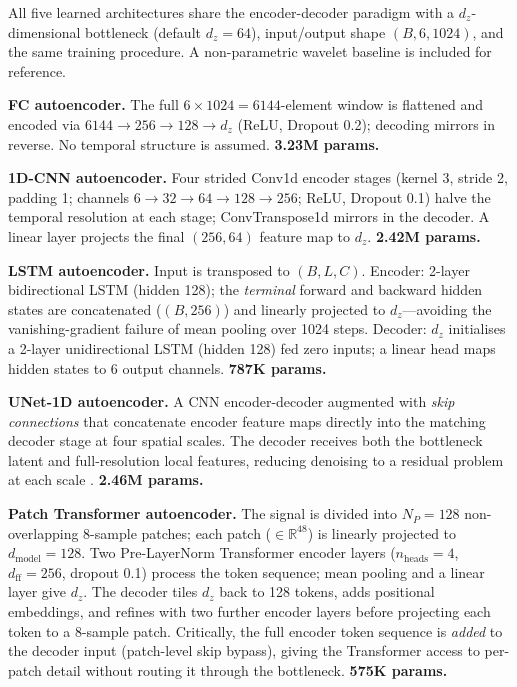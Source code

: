 \documentclass{article}
\begin{document}
All five learned architectures share the encoder-decoder paradigm with a
$d_z$-dimensional bottleneck (default $d_z=64$), input/output shape
$(B,6,1024)$, and the same training procedure.
A non-parametric wavelet baseline is included for reference.

\textbf{FC autoencoder.}
The full $6\!\times\!1024=6144$-element window is flattened and encoded via
$6144\!\to\!256\!\to\!128\!\to\! d_z$ (ReLU, Dropout 0.2); decoding mirrors
in reverse.
No temporal structure is assumed.
\textbf{3.23M params.}

\textbf{1D-CNN autoencoder.}
Four strided Conv1d encoder stages (kernel 3, stride 2, padding 1; channels
$6\!\to\!32\!\to\!64\!\to\!128\!\to\!256$; ReLU, Dropout 0.1) halve the
temporal resolution at each stage; ConvTranspose1d mirrors in the decoder.
A linear layer projects the final $(256,64)$ feature map to $d_z$.
\textbf{2.42M params.}

\textbf{LSTM autoencoder.}
Input is transposed to $(B,L,C)$.
Encoder: 2-layer bidirectional LSTM (hidden 128); the \emph{terminal}
forward and backward hidden states are concatenated ($(B,256)$) and linearly
projected to $d_z$---avoiding the vanishing-gradient failure of mean pooling
over 1024 steps.
Decoder: $d_z$ initialises a 2-layer unidirectional LSTM (hidden 128) fed
zero inputs; a linear head maps hidden states to 6 output channels.
\textbf{787K params.}

\textbf{UNet-1D autoencoder.}
A CNN encoder-decoder augmented with \emph{skip connections} that concatenate
encoder feature maps directly into the matching decoder stage at four spatial
scales.
The decoder receives both the bottleneck latent and full-resolution local
features, reducing denoising to a residual problem at each scale
\citep{ronneberger2015unet,he2016deep}.
\textbf{2.46M params.}

\textbf{Patch Transformer autoencoder.}
The signal is divided into $N_P=128$ non-overlapping 8-sample patches; each
patch ($\in\mathbb{R}^{48}$) is linearly projected to $d_\text{model}=128$.
Two Pre-LayerNorm Transformer encoder layers \citep{vaswani2017attention}
($n_\text{heads}=4$, $d_\text{ff}=256$, dropout 0.1) process the token
sequence; mean pooling and a linear layer give $d_z$.
The decoder tiles $d_z$ back to 128 tokens, adds positional embeddings, and
refines with two further encoder layers before projecting each token to a
8-sample patch.
Critically, the full encoder token sequence is \emph{added} to the decoder
input (patch-level skip bypass), giving the Transformer access to per-patch
detail without routing it through the bottleneck.
\textbf{575K params.}
\end{document}
